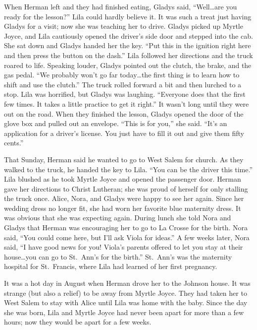 \documentclass[
  american,
  letterpaper,
]{book}
\begin{document}
When Herman left and they had finished eating, Gladys said,
``Well\ldots are you ready for the lesson?'' Lila could hardly believe
it. It was such a treat just having Gladys for a visit; now she was
teaching her to drive. Gladys picked up Myrtle Joyce, and Lila
cautiously opened the driver's side door and stepped into the cab. She
sat down and Gladys handed her the key. ``Put this in the ignition right
here and then press the button on the dash.'' Lila followed her
directions and the truck roared to life. Speaking louder, Gladys pointed
out the clutch, the brake, and the gas pedal. ``We probably won't go far
today\ldots the first thing is to learn how to shift and use the
clutch.'' The truck rolled forward a bit and then lurched to a stop.
Lila was horrified, but Gladys was laughing. ``Everyone does that the
first few times. It takes a little practice to get it right.'' It wasn't
long until they were out on the road. When they finished the lesson,
Gladys opened the door of the glove box and pulled out an envelope.
``This is for you,'' she said. ``It's an application for a driver's
license. You just have to fill it out and give them fifty cents.''

That Sunday, Herman said he wanted to go to West Salem for church. As
they walked to the truck, he handed the key to Lila. ``You can be the
driver this time.'' Lila blushed as he took Myrtle Joyce and opened the
passenger door. Herman gave her directions to Christ Lutheran; she was
proud of herself for only stalling the truck once. Alice, Nora, and
Gladys were happy to see her again. Since her wedding dress no longer
fit, she had worn her favorite blue maternity dress. It was obvious that
she was expecting again. During lunch she told Nora and Gladys that
Herman was encouraging her to go to La Crosse for the birth. Nora said,
``You could come here, but I'll ask Viola for ideas.'' A few weeks
later, Nora said, ``I have good news for you! Viola's parents offered to
let you stay at their house\ldots you can go to St.~Ann's for the
birth.'' St.~Ann's was the maternity hospital for St.~Francis, where
Lila had learned of her first pregnancy.

It was a hot day in August when Herman drove her to the Johnson house.
It was strange (but also a relief) to be away from Myrtle Joyce. They
had taken her to West Salem to stay with Alice until Lila was home with
the baby. Since the day she was born, Lila and Myrtle Joyce had never
been apart for more than a few hours; now they would be apart for a few
weeks.
\end{document}
